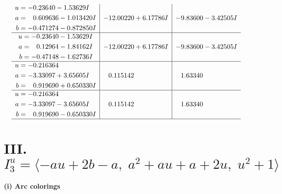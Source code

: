 \documentclass[1p]{elsarticle_modified}
\theoremstyle{definition}
\begin{document}
$$\begin{array}{c|c|c}
\begin{aligned}
u &= -0.23640 - 1.53629 I \\
a &= \phantom{-}0.609636 - 1.013420 I \\
b &= -0.471274 - 0.872850 I\end{aligned}
 & -12.00220 + 6.17786 I & -9.83600 - 3.42505 I \\ \hline\begin{aligned}
u &= -0.23640 - 1.53629 I \\
a &= \phantom{-}0.12964 - 1.84162 I \\
b &= -0.47148 - 1.62736 I\end{aligned}
 & -12.00220 + 6.17786 I & -9.83600 - 3.42505 I \\ \hline\begin{aligned}
u &= -0.216364\phantom{ +0.000000I} \\
a &= -3.33097 + 3.65605 I \\
b &= \phantom{-}0.919690 + 0.650330 I\end{aligned}
 & \phantom{-}0.115142\phantom{ +0.000000I} & \phantom{-}1.63340\phantom{ +0.000000I} \\ \hline\begin{aligned}
u &= -0.216364\phantom{ +0.000000I} \\
a &= -3.33097 - 3.65605 I \\
b &= \phantom{-}0.919690 - 0.650330 I\end{aligned}
 & \phantom{-}0.115142\phantom{ +0.000000I} & \phantom{-}1.63340\phantom{ +0.000000I}\\
 \hline 
 \end{array}$$\newpage\newpage\renewcommand{\arraystretch}{1}
\centering \section*{III. $I^u_{3}= \langle - a u+2 b- a,\;a^2+a u+a+2 u,\;u^2+1 \rangle$}
\flushleft \textbf{(i) Arc colorings}\\
\end{document}
